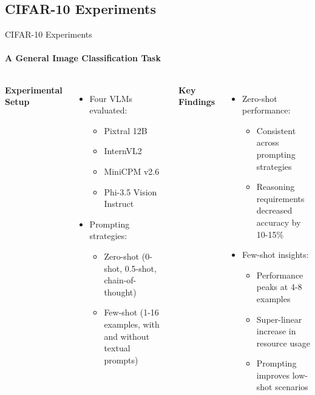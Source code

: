 \documentclass[aspectratio=169]{beamer}
\newcommand\customcolumnwidth{0.4625\textwidth}
\begin{document}
\subsection{CIFAR-10 Experiments}
\begin{frame}{CIFAR-10 Experiments}
\framesubtitle{A General Image Classification Task}
  \vspace{-1em}
  \begin{columns}[T]
    \column{\customcolumnwidth}
      \textbf{Experimental Setup}
      \begin{itemize}
        \item Four VLMs evaluated:
        \begin{itemize}
          \item Pixtral 12B
          \item InternVL2
          \item MiniCPM v2.6
          \item Phi-3.5 Vision Instruct
        \end{itemize}
        \item Prompting strategies:
        \begin{itemize}
          \item Zero-shot (0-shot, 0.5-shot, chain-of-thought)
          \item Few-shot (1-16 examples, with and without textual prompts)
        \end{itemize}
      \end{itemize}
    \column{\customcolumnwidth}
      \textbf{Key Findings}
      \begin{itemize}
        \item Zero-shot performance:
        \begin{itemize}
          \item Consistent across prompting strategies
          \item Reasoning requirements decreased accuracy by 10-15\%
        \end{itemize}
        \item Few-shot insights:
        \begin{itemize}
          \item Performance peaks at 4-8 examples
          \item Super-linear increase in resource usage
          \item Prompting improves low-shot scenarios
        \end{itemize}
      \end{itemize}
  \end{columns}
\end{frame}
\end{document}
